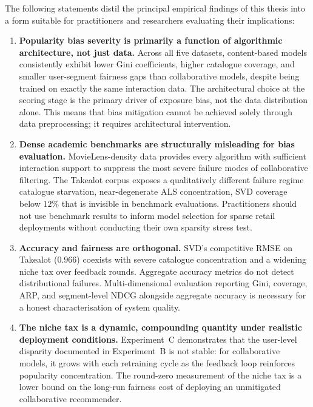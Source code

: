 \documentclass[11pt,a4paper]{report}
\begin{document}
The following statements distil the principal empirical findings of this thesis into a form suitable for practitioners and researchers evaluating their implications:

\begin{enumerate}
    \item \textbf{Popularity bias severity is primarily a function of algorithmic architecture, not just data.} Across all five datasets, content-based models consistently exhibit lower Gini coefficients, higher catalogue coverage, and smaller user-segment fairness gaps than collaborative models, despite being trained on exactly the same interaction data. The architectural choice at the scoring stage is the primary driver of exposure bias, not the data distribution alone. This means that bias mitigation cannot be achieved solely through data preprocessing; it requires architectural intervention.

    \item \textbf{Dense academic benchmarks are structurally misleading for bias evaluation.} MovieLens-density data provides every algorithm with sufficient interaction support to suppress the most severe failure modes of collaborative filtering. The Takealot corpus exposes a qualitatively different failure regime catalogue starvation, near-degenerate ALS concentration, SVD coverage below $12\%$ that is invisible in benchmark evaluations. Practitioners should not use benchmark results to inform model selection for sparse retail deployments without conducting their own sparsity stress test.

    \item \textbf{Accuracy and fairness are orthogonal.} SVD's competitive RMSE on Takealot ($0.966$) coexists with severe catalogue concentration and a widening niche tax over feedback rounds. Aggregate accuracy metrics do not detect distributional failures. Multi-dimensional evaluation reporting Gini, coverage, ARP, and segment-level NDCG alongside aggregate accuracy is necessary for a honest characterisation of system quality.

    \item \textbf{The niche tax is a dynamic, compounding quantity under realistic deployment conditions.} Experiment~C demonstrates that the user-level disparity documented in Experiment~B is not stable: for collaborative models, it grows with each retraining cycle as the feedback loop reinforces popularity concentration. The round-zero measurement of the niche tax is a lower bound on the long-run fairness cost of deploying an unmitigated collaborative recommender.


\end{enumerate}
\end{document}

